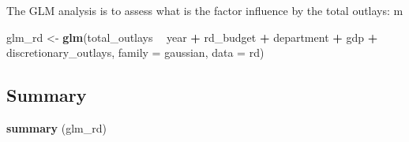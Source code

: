 \documentclass[]{article}
\newenvironment{Shaded}{\begin{snugshade}}{\end{snugshade}}
\newcommand{\KeywordTok}[1]{\textcolor[rgb]{0.13,0.29,0.53}{\textbf{#1}}}
\newcommand{\DataTypeTok}[1]{\textcolor[rgb]{0.13,0.29,0.53}{#1}}
\newcommand{\StringTok}[1]{\textcolor[rgb]{0.31,0.60,0.02}{#1}}
\newcommand{\OperatorTok}[1]{\textcolor[rgb]{0.81,0.36,0.00}{\textbf{#1}}}
\newcommand{\NormalTok}[1]{#1}
\begin{document}
The GLM analysis is to assess what is the factor influence by the total
outlays: m

\begin{Shaded}
\begin{Highlighting}[]
\NormalTok{glm_rd <-}\StringTok{ }\KeywordTok{glm}\NormalTok{(total_outlays }\OperatorTok{~}\StringTok{ }\NormalTok{year }\OperatorTok{+}\StringTok{ }\NormalTok{rd_budget }\OperatorTok{+}\StringTok{ }\NormalTok{department }\OperatorTok{+}\StringTok{ }\NormalTok{gdp }\OperatorTok{+}\StringTok{ }\NormalTok{discretionary_outlays, }\DataTypeTok{family =}\NormalTok{ gaussian, }\DataTypeTok{data =}\NormalTok{ rd)}
\end{Highlighting}
\end{Shaded}

\subsection{Summary}\label{summary-3}

\begin{Shaded}
\begin{Highlighting}[]
\KeywordTok{summary}\NormalTok{ (glm_rd)}
\end{Highlighting}
\end{Shaded}
\end{document}
